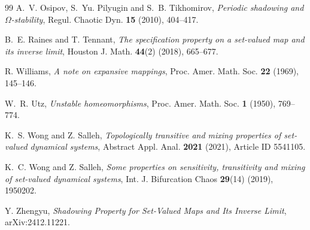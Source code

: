 \documentclass{amsart}
\theoremstyle{definition}
\begin{document}
\begin{thebibliography}{99}
A.~V. Osipov, S.~Yu. Pilyugin and S.~B. Tikhomirov,
\emph{Periodic shadowing and $\Omega$-stability},
Regul. Chaotic Dyn.
\textbf{15} (2010), 404--417.


B.~E. Raines and T. Tennant,
\emph{The specification property on a set-valued map and its inverse limit},
Houston J. Math.
\textbf{44}(2) (2018), 665--677.

R. Williams,
\emph{A note on expansive mappings},
Proc. Amer. Math. Soc.
\textbf{22} (1969), 145--146.

W.~R. Utz,
\emph{Unstable homeomorphisms},
Proc. Amer. Math. Soc.
\textbf{1} (1950), 769--774.

K.~S. Wong and Z. Salleh,
\emph{Topologically transitive and mixing properties of set-valued dynamical systems},
Abstract Appl. Anal.
\textbf{2021} (2021), Article ID 5541105.

K.~C. Wong and Z. Salleh,
\emph{Some properties on sensitivity, transitivity and mixing of set-valued dynamical systems},
Int. J. Bifurcation Chaos
\textbf{29}(14) (2019), 1950202.

Y. Zhengyu,
\emph{Shadowing Property for Set-Valued Maps and Its Inverse Limit},
arXiv:2412.11221.

\end{thebibliography}
\end{document}
